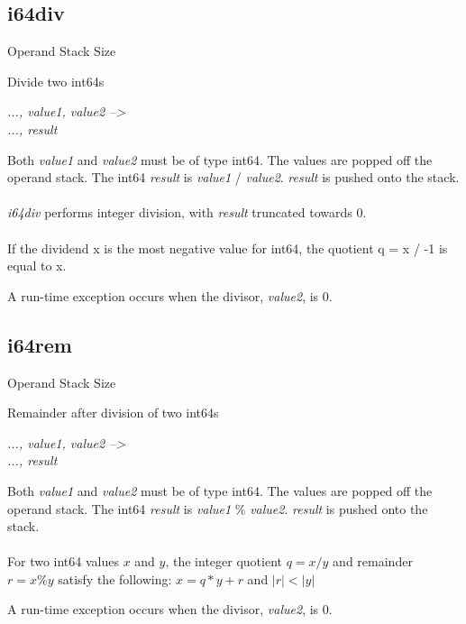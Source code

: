 \documentclass[12pt]{article}
\begin{document}
		\newpage
		\subsection*{i64div}
			\begin{labeling}{Operand Stack Size}
				\item [\textbf{Operation}] Divide two int64s
				\item [\textbf{Format}] 
				\item [\textbf{Operand Stack}] \textit{..., value1, value2 --\textgreater } \\
										\textit{..., result}
				\item [\textbf{Description}] Both \textit{value1} and \textit{value2} must be of type int64. The values are popped off the operand stack. The int64 \textit{result} is \textit{value1} / \textit{value2}. \textit{result} is pushed onto the stack. \\ \\
				\textit{i64div} performs integer division, with \textit{result} truncated towards 0. \\ \\
				 If the dividend x is the most negative value for int64, the quotient q = x / -1 is equal to x.
				 \item [\textbf{Exception}] A run-time exception occurs when the divisor, \textit{value2}, is 0. 
			\end{labeling}		
			
		\newpage
		\subsection*{i64rem}
			\begin{labeling}{Operand Stack Size}
				\item [\textbf{Operation}] Remainder after division of two int64s
				\item [\textbf{Format}] 
				\item [\textbf{Operand Stack}] \textit{..., value1, value2 --\textgreater } \\
										\textit{..., result}
				\item [\textbf{Description}] Both \textit{value1} and \textit{value2} must be of type int64. The values are popped off the operand stack. The int64 \textit{result} is \textit{value1} \% \textit{value2}. \textit{result} is pushed onto the stack. \\ \\
				For two int64 values \(x\) and \(y\), the integer quotient \(q = x / y\) and remainder \(r = x \% y\) satisfy the following: \(x = q*y + r\)  and \(|r| < |y|\) \\ 
				 
				 \item [\textbf{Exception}] A run-time exception occurs when the divisor, \textit{value2}, is 0. 
			\end{labeling}		
			
\end{document}
